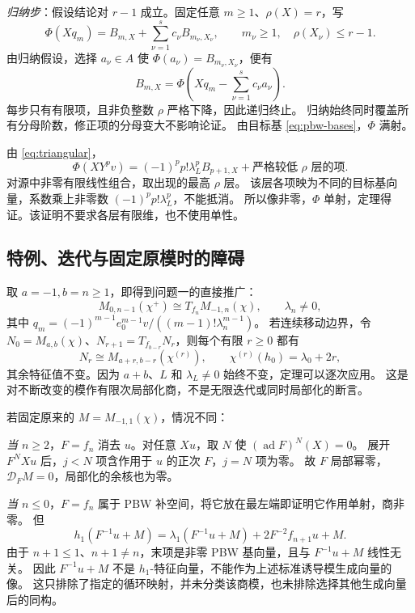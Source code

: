 \documentclass[UTF8,11pt]{ctexart}
\newcommand{\ad}{\operatorname{ad}}
\newcommand{\D}{\mathcal D}
\theoremstyle{definition}
\begin{document}
\emph{归纳步}：假设结论对 \(r-1\) 成立。固定任意 \(m\ge1\)、\(\rho(X)=r\)，写
\[
 \Phi(Xq_m)=B_{m,X}+\sum_{\nu=1}^{s}c_\nu B_{m_\nu,X_\nu},
 \qquad m_\nu\ge1,\quad\rho(X_\nu)\le r-1.
\]
由归纳假设，选择 \(a_\nu\in A\) 使 \(\Phi(a_\nu)=B_{m_\nu,X_\nu}\)，便有
\[
 B_{m,X}=\Phi\left(Xq_m-\sum_{\nu=1}^s c_\nu a_\nu\right).
\]
每步只有有限项，且非负整数 \(\rho\) 严格下降，因此递归终止。
归纳始终同时覆盖所有分母阶数，修正项的分母变大不影响论证。
由目标基 \eqref{eq:pbw-bases}，\(\Phi\) 满射。

由 \eqref{eq:triangular}，
\[
 \Phi(XY^pv)=(-1)^pp!\lambda_L^pB_{p+1,X}
       +\text{严格较低 }\rho\text{ 层的项}.
\]
对源中非零有限线性组合，取出现的最高 \(\rho\) 层。
该层各项映为不同的目标基向量，系数乘上非零数 \((-1)^pp!\lambda_L^p\)，不能抵消。
所以像非零，\(\Phi\) 单射，定理得证。该证明不要求各层有限维，也不使用单性。

\subsection{特例、迭代与固定原模时的障碍}

取 \(a=-1,b=n\ge1\)，即得到问题一的直接推广：
\begin{equation}\label{eq:fn-special}
 M_{0,n-1}(\chi^+)\cong T_{f_n}M_{-1,n}(\chi),\qquad\lambda_n\ne0,
\end{equation}
其中 \(q_m=(-1)^{m-1}e_0^{m-1}v/((m-1)!\lambda_n^{m-1})\)。
若连续移动边界，令 \(N_0=M_{a,b}(\chi)\)、\(N_{r+1}=T_{f_{b-r}}N_r\)，则每个有限 \(r\ge0\) 都有
\[
 N_r\cong M_{a+r,b-r}(\chi^{(r)}),\qquad
 \chi^{(r)}(h_0)=\lambda_0+2r,
\]
其余特征值不变。因为 \(a+b\)、\(L\) 和 \(\lambda_L\ne0\) 始终不变，定理可以逐次应用。
这是对不断改变的模作有限次局部化商，不是无限迭代或同时局部化的断言。

若固定原来的 \(M=M_{-1,1}(\chi)\)，情况不同：

\emph{当 \(n\ge2\)}，\(F=f_n\) 消去 \(u\)。对任意 \(Xu\)，取 \(N\) 使 \((\ad F)^N(X)=0\)。
展开 \(F^NXu\) 后，\(j<N\) 项含作用于 \(u\) 的正次 \(F\)，\(j=N\) 项为零。
故 \(F\) 局部幂零，\(\D_FM=0\)，局部化的余核也为零。

\emph{当 \(n\le0\)}，\(F=f_n\) 属于 PBW 补空间，将它放在最左端即证明它作用单射，商非零。
但
\[
 h_1(F^{-1}u+M)=\lambda_1(F^{-1}u+M)+2F^{-2}f_{n+1}u+M.
\]
由于 \(n+1\le1\)、\(n+1\ne n\)，末项是非零 PBW 基向量，且与 \(F^{-1}u+M\) 线性无关。
因此 \(F^{-1}u+M\) 不是 \(h_1\)-特征向量，不能作为上述标准诱导模生成向量的像。
这只排除了指定的循环映射，并未分类该商模，也未排除选择其他生成向量后的同构。
\end{document}
